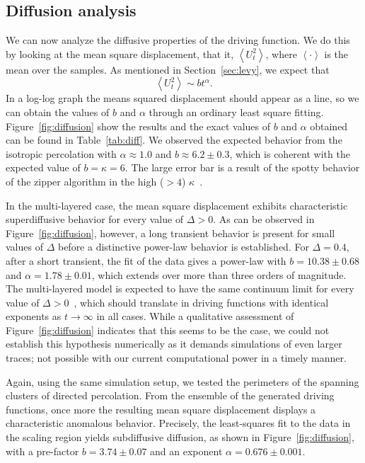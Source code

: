 \subsection{Diffusion analysis}
\label{sec:dif}

We can now analyze the diffusive properties of the driving function. We do this
by looking at the mean square displacement, that it, $\left\langle U_t^2
\right\rangle$, where $\left\langle\cdot\right\rangle$ is the mean over the
samples. As mentioned in Section~\ref{sec:levy}, we expect that
\begin{equation}
    \left\langle U_t^2 \right\rangle\sim bt^\alpha.
\end{equation}
In a log-log graph the means squared displacement should appear as a line, so
we can obtain the values of $b$ and $\alpha$ through an ordinary least square
fitting. Figure~\ref{fig:diffusion} show the results and the exact values of
$b$ and $\alpha$ obtained can be found in Table~\ref{tab:diff}. We observed the
expected behavior from the isotropic percolation with $\alpha\approx1.0$ and
$b\approx6.2\pm0.3$, which is coherent with the expected value of $b=\kappa=6$.
The large error bar is a result of the spotty behavior of the zipper algorithm
in the high ($>4$) $\kappa$~\cite{Kennedy2007}.

In the multi-layered case, the mean square displacement exhibits characteristic
superdiffusive behavior for every value of $\Delta>0$. As can be observed in
Figure~\ref{fig:diffusion}, however, a long transient behavior is present for
small values of $\Delta$ before a distinctive power-law behavior is
established. For $\Delta=0.4$, after a short transient, the fit of the data
gives a power-law with $b=10.38\pm0.68$ and $\alpha=1.78\pm0.01$, which extends
over more than three orders of magnitude. The multi-layered model is expected
to have the same continuum limit for every value of
$\Delta>0$~\cite{Dayan1991}, which should translate in driving functions with
identical exponents as $t\rightarrow\infty$ in all cases. While a qualitative
assessment of Figure~\ref{fig:diffusion} indicates that this seems to be the
case, we could not establish this hypothesis numerically as it demands
simulations of even larger traces; not possible with our current computational
power in a timely manner. 

Again, using the same simulation setup, we tested the perimeters of the spanning
clusters of directed percolation. From the ensemble of the generated driving
functions, once more the resulting mean square displacement displays a
characteristic anomalous behavior. Precisely, the least-squares fit to the data
in the scaling region yields subdiffusive diffusion, as shown in
Figure~\ref{fig:diffusion}, with a pre-factor $b=3.74\pm0.07$ and an exponent
$\alpha=0.676\pm0.001$.

